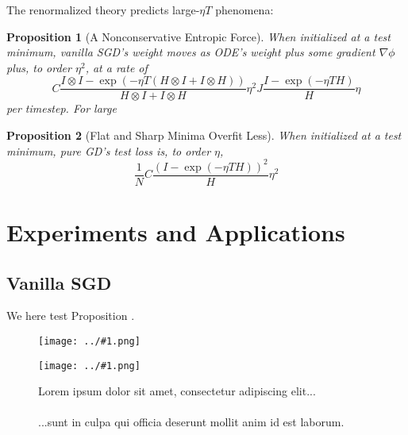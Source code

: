 \documentclass{article}
\newtheorem{prop}{Proposition}
\newcommand{\wrap}[1]{\left(#1\right)}
\newcommand{\plotmoo}[3]{
    \texttt{[image: ../\#1.png]}
}
\newcommand{\lorem}[1]{
    Lorem ipsum dolor sit amet, consectetur adipiscing elit...\\
    \nopagebreak\vspace{#1cm} \ \\
    ...sunt in culpa qui officia deserunt mollit anim id est laborum.
}
\begin{document}
        The renormalized theory predicts large-$\eta T$ phenomena:
        \begin{prop}[A Nonconservative Entropic Force]\label{prop:entropic}
            When initialized at a test minimum, vanilla SGD's weight moves as
            ODE's weight plus some gradient $\nabla\phi$ plus, to order
            $\eta^2$, at a rate of 
            $$
                C
                \frac{I\otimes I - \exp(-\eta T (H\otimes I + I\otimes H))}{H\otimes I + I\otimes H}
                \eta^2 J
                \frac{I - \exp(-\eta T H)}{H}
                \eta
            $$
            per timestep.  For large   
        \end{prop}

        \begin{prop}[Flat and Sharp Minima Overfit Less]\label{prop:overfit}
            When initialized at a test minimum, pure GD's test loss is, to
            order $\eta$, 
            $$
                \frac{1}{N} C \frac{\wrap{I - \exp(-\eta T H)}^2}{H} \eta^2
            $$
        \end{prop}


\section{Experiments and Applications}


    \subsection{Vanilla SGD}
        We here test Proposition \label{prop:vanilla}. 
        \begin{figure}[h!]
            \centering
            \plotmoo{plots/test-vanilla-fashion}{0.48\columnwidth}{3.0cm} 
            \plotmoo{plots/gen-cifar}{0.48\columnwidth}{3.0cm}
            \caption{\lorem{2}}
        \end{figure}
    
\end{document}
